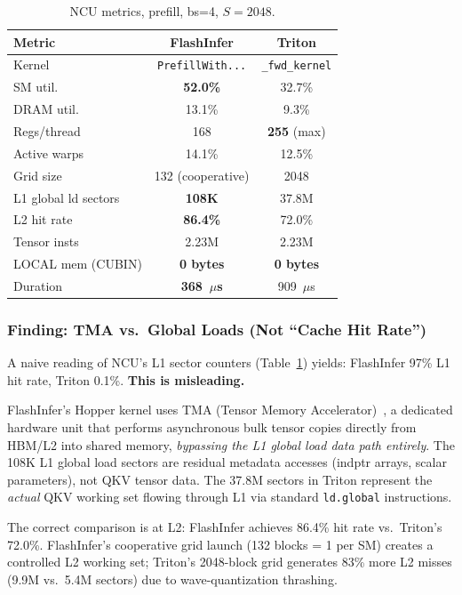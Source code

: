 \documentclass[10pt,twocolumn]{article}
\begin{document}
\begin{table}[h]
\centering
\small
\caption{NCU metrics, prefill, bs=4, $S=2048$.}
\label{tab:ncu_prefill}
\begin{tabular}{@{}lcc@{}}
\toprule
Metric & FlashInfer & Triton \\
\midrule
Kernel       & \texttt{PrefillWith...} & \texttt{\_fwd\_kernel} \\
SM util.     & \textbf{52.0\%} & 32.7\% \\
DRAM util.   & 13.1\% & 9.3\% \\
Regs/thread  & 168 & \textbf{255} (max) \\
Active warps & 14.1\% & 12.5\% \\
Grid size    & 132 (cooperative) & 2048 \\
L1 global ld sectors & \textbf{108K} & 37.8M \\
L2 hit rate  & \textbf{86.4\%} & 72.0\% \\
Tensor insts & 2.23M & 2.23M \\
LOCAL mem (CUBIN) & \textbf{0 bytes} & \textbf{0 bytes} \\
Duration     & \textbf{368~$\mu$s} & 909~$\mu$s \\
\bottomrule
\end{tabular}
\end{table}

\subsubsection{Finding: TMA vs.\ Global Loads (Not ``Cache Hit Rate'')}
\label{sec:tma}

A naive reading of NCU's L1 sector counters (Table~\ref{tab:ncu_prefill}) yields: FlashInfer 97\% L1 hit rate, Triton 0.1\%.  \textbf{This is misleading.}

FlashInfer's Hopper kernel uses TMA (Tensor Memory Accelerator)~\cite{hopper}, a dedicated hardware unit that performs asynchronous bulk tensor copies directly from HBM/L2 into shared memory, \emph{bypassing the L1 global load data path entirely}.  The 108K L1 global load sectors are residual metadata accesses (indptr arrays, scalar parameters), not QKV tensor data.  The 37.8M sectors in Triton represent the \emph{actual} QKV working set flowing through L1 via standard \texttt{ld.global} instructions.

The correct comparison is at L2: FlashInfer achieves 86.4\% hit rate vs.\ Triton's 72.0\%.  FlashInfer's cooperative grid launch (132 blocks = 1 per SM) creates a controlled L2 working set; Triton's 2048-block grid generates 83\% more L2 misses (9.9M vs.\ 5.4M sectors) due to wave-quantization thrashing.
\end{document}
